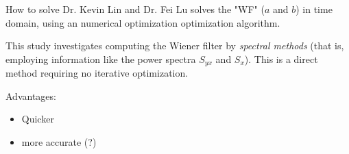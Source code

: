 \documentclass{beamer}  %
\begin{document}
\begin{frame}{How to solve}
	Dr. Kevin Lin and Dr. Fei Lu solves the "WF" ($a$ and $b$) in time domain, using an numerical optimization optimization algorithm. 
	
	\bigskip
	
	This study investigates computing the Wiener filter by \emph{spectral methods} (that is, employing information like the power spectra $S_{yx}$ and $S_{x}$).  This is a direct method requiring no iterative optimization.
	
	\bigskip
	
	Advantages:
	\begin{itemize}
		\item Quicker
		\item more accurate (?)
	\end{itemize}
\end{frame}


\end{document}
